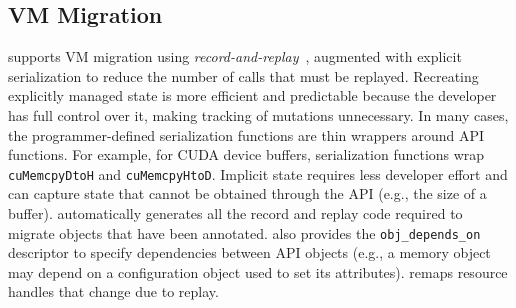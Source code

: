 

\subsection{VM Migration}
\label{s:migration}

\AvA supports VM migration using \emph{record-and-replay}~\cite{migration_survey}, augmented with explicit serialization to reduce the number of calls that must be replayed.
Recreating explicitly managed state is more efficient and predictable because the developer has full control over it, making tracking of mutations unnecessary.
In many cases, the programmer-defined serialization functions are thin wrappers around API functions.
For example, for CUDA device buffers, serialization functions wrap \lstinline|cuMemcpyDtoH| and \lstinline|cuMemcpyHtoD|.
Implicit state requires less developer effort and can capture state that cannot be obtained through the API (e.g., the size of a buffer).
\CAvA automatically generates all the record and replay code required to migrate objects that have been annotated.
\CAvA also provides the \lstinline|obj_depends_on| descriptor to specify dependencies between API objects (e.g., a memory object may depend on a configuration object used to set its attributes).
\AvA remaps resource handles that change due to replay.



